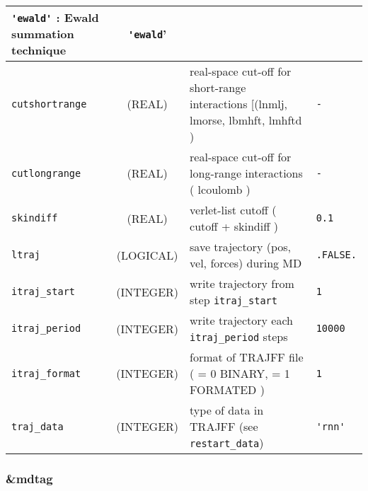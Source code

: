 \documentclass[a4paper]{article}
\begin{document}
\begin{longtable}{l|c|m{8cm}|m{2cm}}
					\verb?'ewald'? : Ewald summation technique \newline                                 &  \verb?'ewald?'      \tabularnewline
\hline
\rule[-0.75cm]{0cm}{1.5cm}
\verb?cutshortrange?    
                 & (REAL)             &  real-space cut-off for short-range interactions  
                                         [(lnmlj, lmorse, lbmhft, lmhftd )  & \verb?-?\\
\hline
\rule[-0.75cm]{0cm}{1.5cm}
\verb?cutlongrange?     
                 & (REAL)             &  real-space cut-off for long-range interactions ( lcoulomb )                        & \verb?-?\\
\hline
\rule[-0.75cm]{0cm}{1.5cm}
\verb?skindiff?  
                 & (REAL)             &  verlet-list cutoff ( cutoff + skindiff )                                           & \verb?0.1?\\
\hline
\rule[-0.75cm]{0cm}{1.5cm}
\verb?ltraj?     & (LOGICAL)          &  save trajectory (pos, vel, forces) during MD                                       & \verb?.FALSE.? \\
\hline
\rule[-0.75cm]{0cm}{1.5cm}
\verb?itraj_start?   
                 & (INTEGER)          &  write trajectory from step \verb?itraj_start?                                      & \verb?1? \\
\hline
\rule[-0.75cm]{0cm}{1.5cm}
\verb?itraj_period?  
                 & (INTEGER)          &  write trajectory each \verb?itraj_period? steps                                    & \verb?10000? \\
\hline
\rule[-0.75cm]{0cm}{1.5cm}
\verb?itraj_format?  
                 & (INTEGER)          &  format of TRAJFF file ( = 0 BINARY, = 1 FORMATED )                                 & \verb?1? \\
\hline
\rule[-0.75cm]{0cm}{1.5cm}
\verb?traj_data? & (INTEGER)          &  type of data in TRAJFF (see \verb?restart_data?)                                   & \verb?'rnn'? \\
\hline
\end{longtable}

\subsubsection{\&mdtag}
\end{document}
